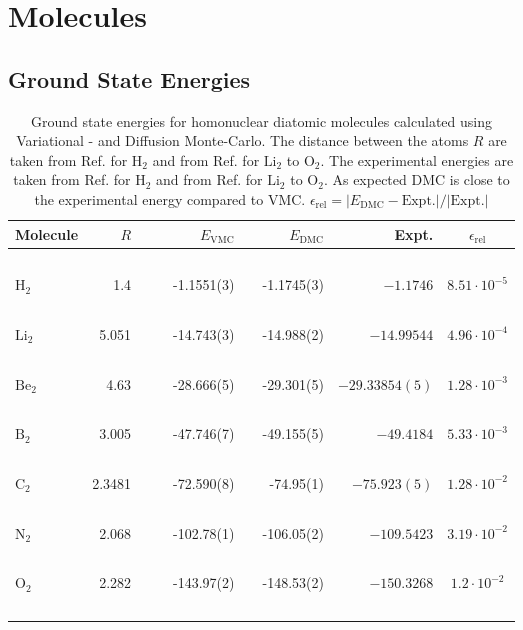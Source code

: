 \section{Molecules}

\subsection{Ground State Energies}
 
\begin{table}
\begin{center}
\begin{tabular}{lrccrlrrc}
Molecule & $R$ & & \qquad & $E_\mathrm{VMC}$ & & \qquad $E_\mathrm{DMC}$ & \qquad\,\, Expt. & \qquad $\epsilon_\mathrm{rel}$\\
\hline\hline
\ \\
$\mathrm{H_2}$ & 1.4   & &\qquad & -1.1551(3)    & \qquad   & -1.1745(3)   & \qquad $-1.1746$      & \qquad $8.51\cdot 10^{-5}$ \\
\ \\
$\mathrm{Li_2}$& 5.051 & &\qquad & -14.743(3)    & \qquad   & -14.988(2)   & \qquad $-14.99544$    & \qquad $4.96\cdot 10^{-4}$ \\
\ \\
$\mathrm{Be_2}$& 4.63  & &\qquad & -28.666(5)    & \qquad   & -29.301(5)   & \qquad $-29.33854(5)$ & \qquad $1.28\cdot 10^{-3}$  \\
\ \\
$\mathrm{B_2}$ & 3.005 & &\qquad & -47.746(7)    & \qquad   & -49.155(5)   & \qquad $-49.4184$     & \qquad $5.33\cdot 10^{-3}$  \\
\ \\
$\mathrm{C_2}$ & 2.3481& &\qquad & -72.590(8)    & \qquad   & -74.95(1)    & \qquad $-75.923(5)$   & \qquad $1.28\cdot 10^{-2}$  \\
\ \\
$\mathrm{N_2}$ & 2.068 & &\qquad & -102.78(1)    & \qquad   & -106.05(2)   & \qquad $-109.5423$    & \qquad $3.19\cdot 10^{-2}$  \\
\ \\
$\mathrm{O_2}$ & 2.282 & &\qquad & -143.97(2)    & \qquad   & -148.53(2)   & \qquad $-150.3268$    & \qquad $1.2\cdot 10^{-2}$  \\
\ \\
\end{tabular}
\caption{Ground state energies for homonuclear diatomic molecules calculated using Variational - and Diffusion Monte-Carlo. The distance between the atoms $R$ are taken from Ref. \cite{H_He_exact} for $\mathrm{H_2}$ and from Ref. \cite{UmrigarMolecules} for $\mathrm{Li_2}$ to $\mathrm{O_2}$. The experimental energies are taken from Ref. \cite{H_He_exact} for $\mathrm{H_2}$ and from Ref. \cite{ExactMolecules} for $\mathrm{Li_2}$ to $\mathrm{O_2}$. As expected DMC is close to the experimental energy compared to VMC. $\epsilon_\mathrm{rel} = |E_\mathrm{DMC} - \mathrm{Expt.}|/|\mathrm{Expt.}|$}
\label{tab:MoleculesRes}
\end{center}
\end{table}


